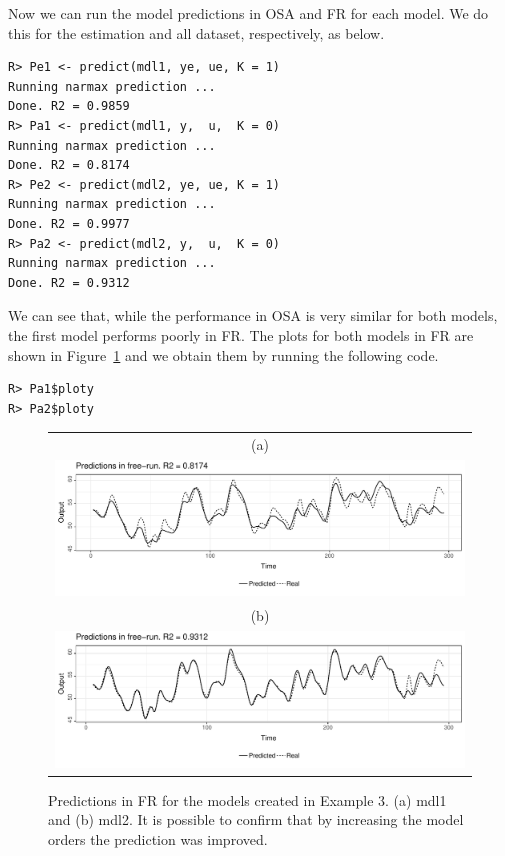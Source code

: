 \documentclass[preprint,12pt, a4paper]{elsarticle}
\begin{document}
Now we can run the model predictions in OSA and FR for each model. We do this for the estimation and all dataset, respectively, as below.

\begin{verbatim}
R> Pe1 <- predict(mdl1, ye, ue, K = 1)
Running narmax prediction ... 
Done. R2 = 0.9859      
R> Pa1 <- predict(mdl1, y,  u,  K = 0)
Running narmax prediction ... 
Done. R2 = 0.8174     
R> Pe2 <- predict(mdl2, ye, ue, K = 1)
Running narmax prediction ... 
Done. R2 = 0.9977                     
R> Pa2 <- predict(mdl2, y,  u,  K = 0)
Running narmax prediction ... 
Done. R2 = 0.9312        
\end{verbatim}

We can see that, while the performance in OSA is very similar for both models, the first model performs poorly in FR. The plots for both models in FR are shown in Figure~\ref{fig:ex3y} and we obtain them by running the following code.

\begin{verbatim}
R> Pa1$ploty
R> Pa2$ploty
\end{verbatim}

\begin{figure}[t!]
	\centering
	\begin{tabular}{c}
		(a) \\
		\includegraphics[width=15cm,keepaspectratio]{ex3y1}  \\ 
		(b) \\
		\includegraphics[width=15cm,keepaspectratio]{ex3y2}
	\end{tabular}
	\caption{Predictions in FR for the models created in Example 3. (a) mdl1 and (b) mdl2. It is possible to confirm that by increasing the model orders the prediction was improved.} \label{fig:ex3y}
\end{figure}
\end{document}
